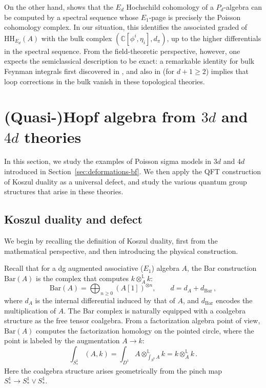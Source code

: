 \documentclass[11pt]{article}
\newcommand{\C}{\mathbb{C}}
\numberwithin{equation}{section}
\begin{document}
On the other hand, \cite{ginot2017} shows that the $E_d$ Hochschild cohomology of a $P_d$-algebra can be computed by a spectral sequence whose $E_1$-page is precisely the Poisson cohomology complex. In our situation, this identifies the associated graded of $\mathrm{HH}_{E_d}(A)$ with the bulk complex $(\C[\phi^i,\eta_i],d_\pi)$, up to the higher differentials in the spectral sequence. From the field-theoretic perspective, however, one expects the semiclassical description to be exact: a remarkable identity for bulk Feynman integrals first discovered in \cite{Gaiotto:2024gii}, and also in \cite{balduf2025combinatorial,wang2024factorization} (for $d+1\ge 2$) implies that loop corrections in the bulk vanish in these topological theories. 


\section{(Quasi-)Hopf algebra from $3d$ and $4d$ theories}
\label{sec:Koszul}
In this section, we study the examples of Poisson sigma models in $3d$ and $4d$ introduced in Section~\ref{sec:deformations-bf}. We then apply the QFT construction of Koszul duality as a universal defect, and study the various quantum group structures that arise in these theories.
\subsection{Koszul duality and defect}
We begin by recalling the definition of Koszul duality, first from the mathematical perspective, and then introducing the physical construction.

Recall that for a dg augmented associative ($E_1$) algebra $A$, the Bar construction $\mathrm{Bar}(A)$ is the complex that computes $k\otimes_A^{\mathbb{L}}k$:
\begin{equation}
	\mathrm{Bar}(A) = \bigoplus_{n\geq 0} (A[1])^{\otimes n},\quad\quad d = d_{A} + d_{\mathrm{Bar}}\,,
\end{equation}
where $d_{A}$ is the internal differential induced by that of $A$, and $d_{\mathrm{Bar}}$ encodes the multiplication of $A$. The Bar complex is naturally equipped with a coalgebra structure as the free tensor coalgebra. From a factorization algebra point of view, $\mathrm{Bar}(A)$ computes the factorization homology on the pointed circle, where the point is labeled by the augmentation $A \to k$:
\begin{equation}
	\int_{S^1_*} (A,k) = \int_{D^1}A\otimes_{\int_{S^0}\!\!A}^{\mathbb{L}}k =  k\otimes_A^{\mathbb{L}}k\,.
\end{equation}
Here the coalgebra structure arises geometrically from the pinch map $S^1_* \to S^1_* \vee S^{1}_*$.
\end{document}
